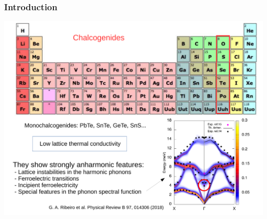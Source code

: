 \documentclass{beamer}
\begin{document}

\begin{frame}

\frametitle{Introduction}
\vspace{-0.5cm}
\begin{center}
\includegraphics[width=0.85\linewidth]{Pictures/INTRO/chalcogenides.pdf}
\end{center}

\end{frame}


%
%

\end{document}
